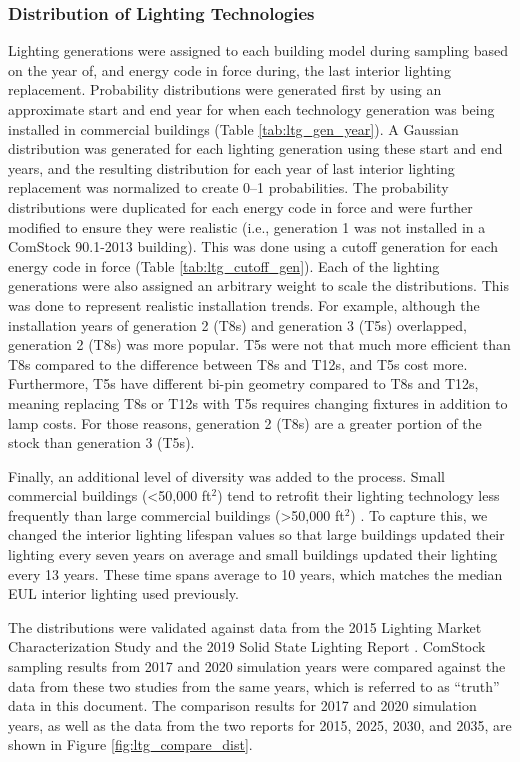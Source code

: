 \pagebreak
\subsubsection{Distribution of Lighting Technologies}

Lighting generations were assigned to each building model during sampling based on the year of, and energy code in force during, the last interior lighting replacement.  Probability distributions were generated first by using an approximate start and end year for when each technology generation was being installed in commercial buildings (Table \ref{tab:ltg_gen_year}). A Gaussian distribution was generated for each lighting generation using these start and end years, and the resulting distribution for each year of last interior lighting replacement was normalized to create 0--1 probabilities. The probability distributions were duplicated for each energy code in force and were further modified to ensure they were realistic (i.e., generation 1 was not installed in a ComStock 90.1-2013 building). This was done using a cutoff generation for each energy code in force (Table \ref{tab:ltg_cutoff_gen}). Each of the lighting generations were also assigned an arbitrary weight to scale the distributions. This was done to represent realistic installation trends. For example, although the installation years of generation 2 (T8s) and generation 3 (T5s) overlapped, generation 2 (T8s) was more popular. T5s were not that much more efficient than T8s compared to the difference between T8s and T12s, and T5s cost more. Furthermore, T5s have different bi-pin geometry compared to T8s and T12s, meaning replacing T8s or T12s with T5s requires changing fixtures in addition to lamp costs. For those reasons, generation 2 (T8s) are a greater portion of the stock than generation 3 (T5s).



Finally, an additional level of diversity was added to the process.  Small commercial buildings (<50,000 ft$^2$) tend to retrofit their lighting technology less frequently than large commercial buildings (>50,000 ft$^2$) \citep{neea2019cbsa}.  To capture this, we changed the interior lighting lifespan values so that large buildings updated their lighting every seven years on average and small buildings updated their lighting every 13 years. These time spans average to 10 years, which matches the median EUL interior lighting used previously.

The distributions were validated against data from the 2015 Lighting Market Characterization Study \citep{doe2015lmc} and the 2019 Solid State Lighting Report \citep{doe2019ssl}. ComStock sampling results from 2017 and 2020 simulation years were compared against the data from these two studies from the same years, which is referred to as ``truth'' data in this document. The comparison results for 2017 and 2020 simulation years, as well as the data from the two reports for 2015, 2025, 2030, and 2035, are shown in Figure \ref{fig:ltg_compare_dist}.

